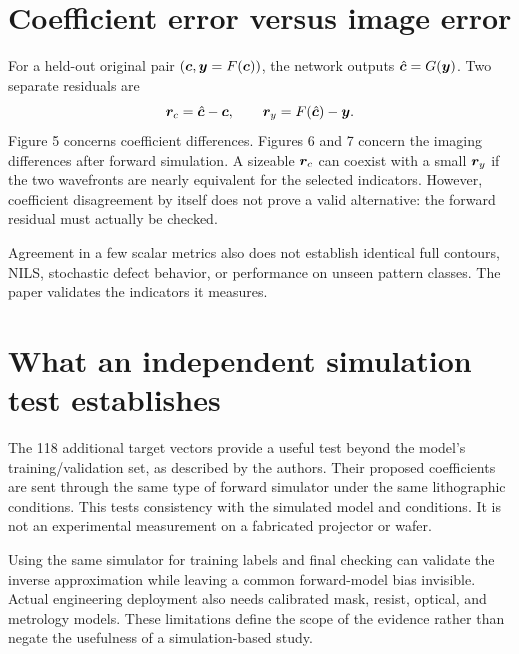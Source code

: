 \section{Coefficient error versus image error}
For a held-out original pair $(\bm{c},\bm{y}=F(\bm{c}))$,
the network outputs $\hat{\bm{c}}=G(\bm{y})$.
Two separate residuals are
\[
\bm{r}_c=\hat{\bm{c}}-\bm{c},\qquad
\bm{r}_y=F(\hat{\bm{c}})-\bm{y}.
\]
Figure 5 concerns coefficient differences. Figures 6 and 7 concern the
imaging differences after forward simulation.
A sizeable $\bm{r}_c$ can coexist with a small $\bm{r}_y$ if the two
wavefronts are nearly equivalent for the selected indicators.
However, coefficient disagreement by itself does not prove a valid
alternative: the forward residual must actually be checked.

Agreement in a few scalar metrics also does not establish identical
full contours, NILS, stochastic defect behavior, or performance on
unseen pattern classes. The paper validates the indicators it measures.

\section{What an independent simulation test establishes}
The 118 additional target vectors provide a useful test beyond the model's
training/validation set, as described by the authors.
Their proposed coefficients are sent through the same type of forward
simulator under the same lithographic conditions.
This tests consistency with the simulated model and conditions.
It is not an experimental measurement on a fabricated projector or wafer.

Using the same simulator for training labels and final checking can
validate the inverse approximation while leaving a common forward-model
bias invisible. Actual engineering deployment also needs calibrated
mask, resist, optical, and metrology models.
These limitations define the scope of the evidence rather than negate
the usefulness of a simulation-based study.
